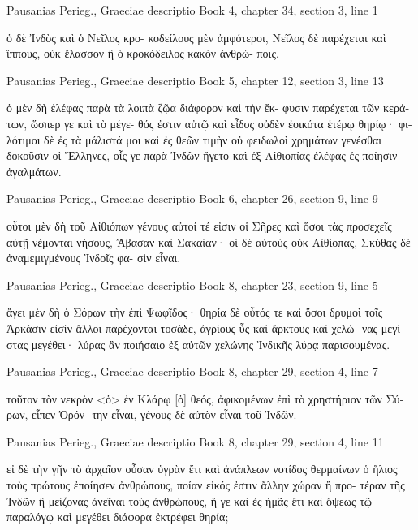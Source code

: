 \documentclass[12pt,letterpaper,twoside,final]{memoir}
\begin{document}
\begin{greek}
Pausanias Perieg., Graeciae descriptio 
Book 4, chapter 34, section 3, line 1

                           ὁ δὲ Ἰνδὸς καὶ ὁ Νεῖλος κρο-
κοδείλους μὲν ἀμφότεροι, Νεῖλος δὲ παρέχεται καὶ 
ἵππους, οὐκ ἔλασσον ἢ ὁ κροκόδειλος κακὸν ἀνθρώ-
ποις. 



Pausanias Perieg., Graeciae descriptio 
Book 5, chapter 12, section 3, line 13

                                                   ὁ μὲν 
δὴ ἐλέφας παρὰ τὰ λοιπὰ ζῷα διάφορον καὶ τὴν ἔκ-
φυσιν παρέχεται τῶν κεράτων, ὥσπερ γε καὶ τὸ μέγε-
θός ἐστιν αὐτῷ καὶ εἶδος οὐδὲν ἐοικότα ἑτέρῳ θηρίῳ· 
φιλότιμοι δὲ ἐς τὰ μάλιστά μοι καὶ ἐς θεῶν τιμὴν οὐ 
φειδωλοὶ χρημάτων γενέσθαι δοκοῦσιν οἱ Ἕλληνες, 
οἷς γε παρὰ Ἰνδῶν ἤγετο καὶ ἐξ Αἰθιοπίας ἐλέφας ἐς 
ποίησιν ἀγαλμάτων. 



Pausanias Perieg., Graeciae descriptio 
Book 6, chapter 26, section 9, line 9

                      οὗτοι μὲν δὴ τοῦ Αἰθιόπων γένους 
αὐτοί τέ εἰσιν οἱ Σῆρες καὶ ὅσοι τὰς προσεχεῖς αὐτῇ 
νέμονται νήσους, Ἄβασαν καὶ Σακαίαν· οἱ δὲ αὐτοὺς 
οὐκ Αἰθίοπας, Σκύθας δὲ ἀναμεμιγμένους Ἰνδοῖς φα-
σὶν εἶναι. 



Pausanias Perieg., Graeciae descriptio 
Book 8, chapter 23, section 9, line 5

ἄγει μὲν δὴ ὁ Σόρων τὴν ἐπὶ Ψωφῖδος· θηρία δὲ 
οὗτός τε καὶ ὅσοι δρυμοὶ τοῖς Ἀρκάσιν εἰσὶν ἄλλοι 
παρέχονται τοσάδε, ἀγρίους ὗς καὶ ἄρκτους καὶ χελώ-
νας μεγίστας μεγέθει· λύρας ἂν ποιήσαιο ἐξ αὐτῶν 
χελώνης Ἰνδικῆς λύρᾳ παρισουμένας. 



Pausanias Perieg., Graeciae descriptio 
Book 8, chapter 29, section 4, line 7

       τοῦτον τὸν νεκρὸν <ὁ> ἐν Κλάρῳ [ὁ] θεός, 
ἀφικομένων ἐπὶ τὸ χρηστήριον τῶν Σύρων, εἶπεν Ὀρόν-
την εἶναι, γένους δὲ αὐτὸν εἶναι τοῦ Ἰνδῶν. 



Pausanias Perieg., Graeciae descriptio 
Book 8, chapter 29, section 4, line 11

                                                        εἰ δὲ 
τὴν γῆν τὸ ἀρχαῖον οὖσαν ὑγρὰν ἔτι καὶ ἀνάπλεων 
νοτίδος θερμαίνων ὁ ἥλιος τοὺς πρώτους ἐποίησεν 
ἀνθρώπους, ποίαν εἰκός ἐστιν ἄλλην χώραν ἢ προ-
τέραν τῆς Ἰνδῶν ἢ μείζονας ἀνεῖναι τοὺς ἀνθρώπους, 
ἥ γε καὶ ἐς ἡμᾶς ἔτι καὶ ὄψεως τῷ παραλόγῳ καὶ 
μεγέθει διάφορα ἐκτρέφει θηρία; 




\end{greek}
\end{document}
